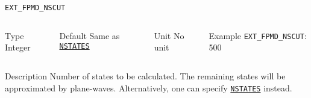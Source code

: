 \begin{frame}[allowframebreaks]{\texttt{EXT\_FPMD\_NSCUT}} \label{EXT_FPMD_NSCUT}
\vspace*{-12pt}
\begin{columns}
\begin{block}{Type}
Integer
\end{block}

\begin{block}{Default}
Same as \hyperlink{NSTATES}{\texttt{NSTATES}}
\end{block}

\begin{block}{Unit}
No unit
\end{block}

\begin{block}{Example}
\texttt{EXT\_FPMD\_NSCUT}: 500
\end{block}
\end{columns}

\begin{block}{Description}
Number of states to be calculated. The remaining states will be approximated by plane-waves. Alternatively, one can specify \hyperlink{NSTATES}{\texttt{NSTATES}} instead.
\end{block}

\end{frame}

